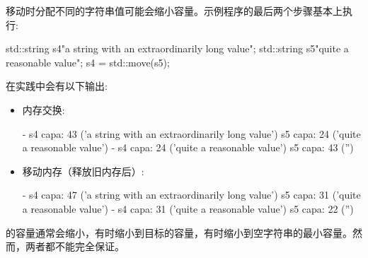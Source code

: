 移动时分配不同的字符串值可能会缩小容量。示例程序的最后两个步骤基本上执行:

\begin{cppcode}
std::string s4{"a string with an extraordinarily long value"};
std::string s5{"quite a reasonable value"};
s4 = std::move(s5);
\end{cppcode}

在实践中会有以下输出:

\begin{itemize}
	\item 内存交换:
	\begin{outputcode}
- s4 capa: 43 ('a string with an extraordinarily long value')
s5 capa: 24 ('quite a reasonable value')
- s4 capa: 24 ('quite a reasonable value')
s5 capa: 43 ('')
	\end{outputcode}
	\item 移动内存（释放旧内存后）:
	\begin{outputcode}
- s4 capa: 47 ('a string with an extraordinarily long value')
s5 capa: 31 ('quite a reasonable value')
- s4 capa: 31 ('quite a reasonable value')
s5 capa: 22 ('')
	\end{outputcode}
\end{itemize}

的容量通常会缩小，有时缩小到目标的容量，有时缩小到空字符串的最小容量。然而，两者都不能完全保证。
